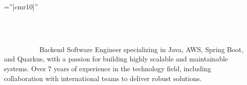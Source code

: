 \documentclass[a4paper,12pt]{article}
\begin{document}
\pagestyle{empty} %

\font\fb=''[cmr10]'' %

\par{
    \\
    \textcolor{white}{\tiny\textbf{Contact}}\\
\par}
\noindent{}

\vspace{-8pt}
\textcolor{white}{\tiny\textbf{Summary}}
\vspace{-8pt}
\justify
\noindent
{\normalsize Backend Software Engineer specializing in Java, AWS, Spring Boot, and Quarkus, with a passion for building highly scalable and maintainable systems. Over 7 years of experience in the technology field, including collaboration with international teams to deliver robust solutions.}

\end{document}
